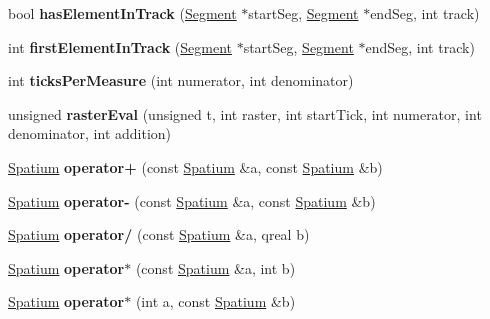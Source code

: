 \begin{DoxyCompactItemize}
bool {\bfseries has\+Element\+In\+Track} (\hyperlink{class_ms_1_1_segment}{Segment} $\ast$start\+Seg, \hyperlink{class_ms_1_1_segment}{Segment} $\ast$end\+Seg, int track)
\item 
\mbox{\label{namespace_ms_a83654142aee8db9acb8003046c0eb495}} 
int {\bfseries first\+Element\+In\+Track} (\hyperlink{class_ms_1_1_segment}{Segment} $\ast$start\+Seg, \hyperlink{class_ms_1_1_segment}{Segment} $\ast$end\+Seg, int track)
\item 
\mbox{\label{namespace_ms_a0993002ba5517ef2f4ca31d6bd5a1e08}} 
int {\bfseries ticks\+Per\+Measure} (int numerator, int denominator)
\item 
\mbox{\label{namespace_ms_a863c2ade27c3122d761010fa3d62ff31}} 
unsigned {\bfseries raster\+Eval} (unsigned t, int raster, int start\+Tick, int numerator, int denominator, int addition)
\item 
\mbox{\label{namespace_ms_a103157790051c565634c9292a8a55344}} 
\hyperlink{class_ms_1_1_spatium}{Spatium} {\bfseries operator+} (const \hyperlink{class_ms_1_1_spatium}{Spatium} \&a, const \hyperlink{class_ms_1_1_spatium}{Spatium} \&b)
\item 
\mbox{\label{namespace_ms_a0ed1a79ead9fb093a5f5c46d4ec8d2e8}} 
\hyperlink{class_ms_1_1_spatium}{Spatium} {\bfseries operator-\/} (const \hyperlink{class_ms_1_1_spatium}{Spatium} \&a, const \hyperlink{class_ms_1_1_spatium}{Spatium} \&b)
\item 
\mbox{\label{namespace_ms_a8968c5a55b999c8e69d6c3872a4bbf14}} 
\hyperlink{class_ms_1_1_spatium}{Spatium} {\bfseries operator/} (const \hyperlink{class_ms_1_1_spatium}{Spatium} \&a, qreal b)
\item 
\mbox{\label{namespace_ms_ac373746530c9159e531e98fe4829473b}} 
\hyperlink{class_ms_1_1_spatium}{Spatium} {\bfseries operator$\ast$} (const \hyperlink{class_ms_1_1_spatium}{Spatium} \&a, int b)
\item 
\mbox{\label{namespace_ms_ae1d1017e2ad39cc4744b7656400722b0}} 
\hyperlink{class_ms_1_1_spatium}{Spatium} {\bfseries operator$\ast$} (int a, const \hyperlink{class_ms_1_1_spatium}{Spatium} \&b)

\end{DoxyCompactItemize}
